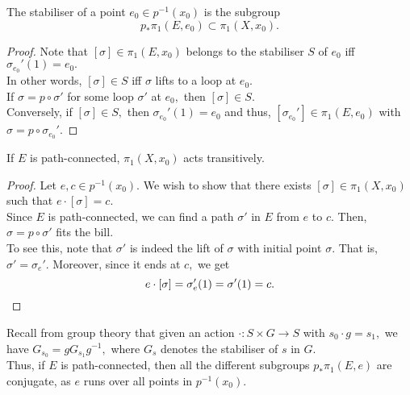 \documentclass[12pt]{article}
\begin{document}
\begin{prop}
	The stabiliser of a point $e_0 \in p^{-1}(x_0)$ is the subgroup 
	\begin{equation*} 
		p_*\pi_1(E, e_0) \subset \pi_1(X, x_0).
	\end{equation*}
\end{prop}
\begin{proof} 
	Note that $[\sigma] \in \pi_1(E, x_0)$ belongs to the stabiliser $S$ of $e_0$ iff $\sigma_{e_0}'(1) = e_0.$\\
	In other words, $[\sigma] \in S$ iff $\sigma$ lifts to a loop at $e_0.$\\
	If $\sigma = p \circ \sigma'$ for some loop $\sigma'$ at $e_0,$ then $[\sigma] \in S.$\\
	Conversely, if $[\sigma] \in S,$ then $\sigma_{e_0}'(1) = e_0$ and thus, $[\sigma_{e_0}'] \in \pi_1(E, e_0)$ with $\sigma = p \circ \sigma_{e_0}'.$
\end{proof}

\begin{prop} \label{prop:pathconnectedcoveringtransitive}
	If $E$ is path-connected, $\pi_1(X, x_0)$ acts transitively.
\end{prop}
\begin{proof} 
	Let $e, c \in p^{-1}(x_0).$ We wish to show that there exists $[\sigma] \in \pi_1(X, x_0)$ such that $e\cdot[\sigma] = c.$\\
	Since $E$ is path-connected, we can find a path $\sigma'$ in $E$ from $e$ to $c.$ Then, $\sigma = p \circ \sigma'$ fits the bill.\\
	To see this, note that $\sigma'$ is indeed the lift of $\sigma$ with initial point $\sigma.$ That is, $\sigma' = \sigma_e'.$ Moreover, since it ends at $c,$ we get
	\begin{equation*} 
		e\cdot[\sigma] = \sigma_e'(1) = \sigma'(1) = c. \qedhere
	\end{equation*}
\end{proof}

Recall from group theory that given an action $\cdot:S \times G \to S$ with $s_0\cdot g = s_1,$ we have $G_{s_0} = gG_{s_1}g^{-1},$ where $G_s$ denotes the stabiliser of $s$ in $G.$\\
Thus, if $E$ is path-connected, then all the different subgroups $p_*\pi_1(E, e)$ are conjugate, as $e$ runs over all points in $p^{-1}(x_0).$
\end{document}
